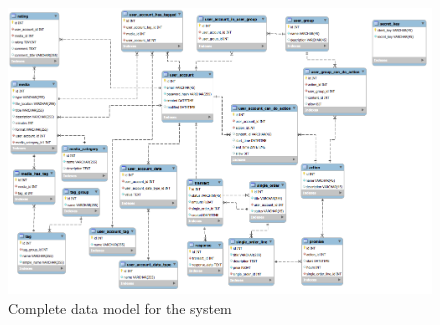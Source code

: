 \documentclass[11pt]{article}
\begin{document}
\begin{figure}[h!]
  \caption{Complete data model for the system}
  \centering
    \includegraphics[width=1\textwidth, angle=270]{images/data_model_final.png}
\end{figure}

\newpage
~\\
\newpage
\end{document}
